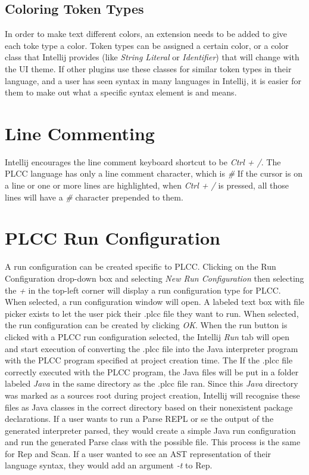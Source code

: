 \documentclass[conference, letterpaper]{IEEEtran}
\begin{document}
\subsection{Coloring Token Types}\label{subsec:coloring-token-types}
In order to make text different colors, an extension needs to be added to give each toke type a color.
Token types can be assigned a certain color, or a color class that Intellij provides (like \textit{String Literal} or \textit{Identifier}) that will change with the UI theme.
If other plugins use these classes for similar token types in their language, and a user has seen syntax in many languages in Intellij, it is easier for them to make out what a specific syntax element is and means.


\section{Line Commenting}\label{sec:line-commenting}
Intellij encourages the line comment keyboard shortcut to be \textit{Ctrl + /}.
The PLCC language has only a line comment character, which is \textit{\#}
If the cursor is on a line or one or more lines are highlighted, when \textit{Ctrl + /} is pressed, all those lines will have a \textit{\#} character prepended to them.


\section{PLCC Run Configuration}\label{sec:plcc-run-configuration}
A run configuration can be created specific to PLCC\@.
Clicking on the Run Configuration drop-down box and selecting \textit{New Run Configuration} then selecting the \textit{+} in the top-left corner will display a run configuration type for PLCC\@.
When selected, a run configuration window will open.
A labeled text box with file picker exists to let the user pick their .plcc file they want to run.
When selected, the run configuration  can be created by clicking \textit{OK}.
When the run button is clicked with a PLCC run configuration selected, the Intellij \textit{Run} tab will open and start execution of converting the .plcc file into the Java interpreter program with the PLCC program specified at project creation time.
The If the .plcc file correctly executed with the PLCC program, the Java files will be put in a folder labeled \textit{Java} in the same directory as the .plcc file ran.
Since this \textit{Java} directory was marked as a sources root during project creation, Intellij will recognise these files as Java classes in the correct directory based on their nonexistent package declarations.
If a user wants to run a Parse REPL or se the output of the generated interpreter parsed, they would create a simple Java run configuration and run the generated Parse class with the possible file.
This process is the same for Rep and Scan.
If a user wanted to see an AST representation of their language syntax, they would add an argument \textit{-t} to Rep.
\end{document}
